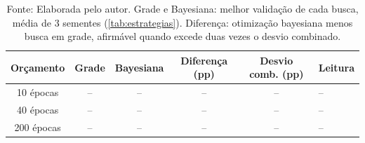 \begin{table}[H]
    \centering
    \caption{Diferença entre a otimização bayesiana e a busca em grade, por orçamento de épocas (Indian Pines, 27 \textit{trials}, 3 sementes, 10\% do treino)}
    \begin{tabular}{|c|c|c|c|c|l|}
        \hline
        \rowcolor[HTML]{C0C0C0}
        \textbf{Orçamento} & \textbf{Grade} & \textbf{Bayesiana} & \textbf{Diferença (pp)} & \textbf{Desvio comb. (pp)} & \textbf{Leitura} \\
        \hline
        10 épocas & -- & -- & -- & -- & -- \\ \hline
        40 épocas & -- & -- & -- & -- & -- \\ \hline
        200 épocas & -- & -- & -- & -- & -- \\ \hline
    \end{tabular}
    \captionsetup{justification=raggedright}
    \caption*{Fonte: Elaborada pelo autor. Grade e Bayesiana: melhor validação de cada busca, média de 3 sementes (\autoref{tab:estrategias}). Diferença: otimização bayesiana menos busca em grade, afirmável quando excede duas vezes o desvio combinado. }
    \label{tab:estrategiasRuido}
\end{table}

